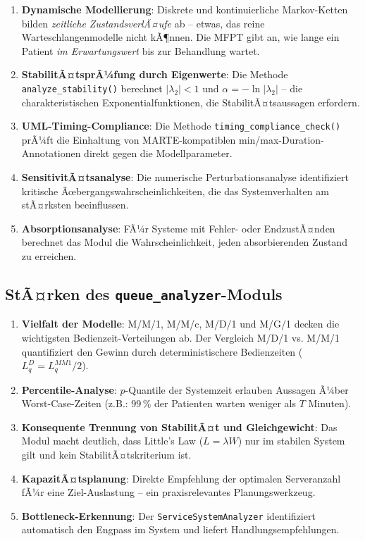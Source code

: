 ﻿\documentclass[a4paper,12pt]{report}
\theoremstyle{definition}
\begin{document}
\begin{enumerate}
	\item[-] \textbf{Dynamische Modellierung}: Diskrete und kontinuierliche
	Markov-Ketten bilden \emph{zeitliche ZustandsverlÃ¤ufe} ab -- etwas,
	das reine Warteschlangenmodelle nicht kÃ¶nnen. Die MFPT gibt an, wie
	lange ein Patient \emph{im Erwartungswert} bis zur Behandlung wartet.
	\item[-] \textbf{StabilitÃ¤tsprÃ¼fung durch Eigenwerte}: Die Methode
	\texttt{analyze\_stability()} berechnet $|\lambda_2| < 1$ und
	$\alpha = -\ln|\lambda_2|$ -- die charakteristischen Exponentialfunktionen,
	die StabilitÃ¤tsaussagen erfordern.
	\item[-] \textbf{UML-Timing-Compliance}: Die Methode
	\texttt{timing\_compliance\_check()} prÃ¼ft die Einhaltung von
	MARTE-kompatiblen min/max-Duration-Annotationen direkt gegen die
	Modellparameter.
	\item[-] \textbf{SensitivitÃ¤tsanalyse}: Die numerische Perturbationsanalyse
	identifiziert kritische Ãœbergangswahrscheinlichkeiten, die das
	Systemverhalten am stÃ¤rksten beeinflussen.
	\item[-] \textbf{Absorptionsanalyse}: FÃ¼r Systeme mit Fehler- oder
	EndzustÃ¤nden berechnet das Modul die Wahrscheinlichkeit, jeden
	absorbierenden Zustand zu erreichen.
\end{enumerate}

\subsection{StÃ¤rken des \texttt{queue\_analyzer}-Moduls}

\begin{enumerate}
	\item[-] \textbf{Vielfalt der Modelle}: M/M/1, M/M/c, M/D/1 und M/G/1
	decken die wichtigsten Bedienzeit-Verteilungen ab. Der Vergleich
	M/D/1 vs. M/M/1 quantifiziert den Gewinn durch deterministischere
	Bedienzeiten ($L_q^D = L_q^{MM1}/2$).
	\item[-] \textbf{Percentile-Analyse}: $p$-Quantile der Systemzeit erlauben
	Aussagen Ã¼ber Worst-Case-Zeiten (z.B.: 99\,\% der Patienten warten
	weniger als $T$ Minuten).
	\item[-] \textbf{Konsequente Trennung von StabilitÃ¤t und Gleichgewicht}:
	Das Modul macht deutlich, dass Little's Law ($L = \lambda W$) nur im
	stabilen System gilt und kein StabilitÃ¤tskriterium ist.
	\item[-] \textbf{KapazitÃ¤tsplanung}: Direkte Empfehlung der optimalen
	Serveranzahl fÃ¼r eine Ziel-Auslastung -- ein praxisrelevantes
	Planungswerkzeug.
	\item[-] \textbf{Bottleneck-Erkennung}: Der \texttt{ServiceSystemAnalyzer}
	identifiziert automatisch den Engpass im System und liefert
	Handlungsempfehlungen.
\end{enumerate}
\end{document}
